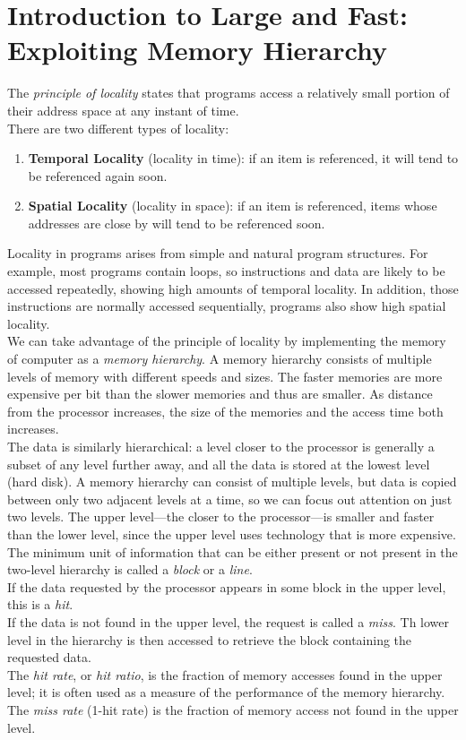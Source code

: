 \documentclass[12pt]{article}
\theoremstyle{definition}
\begin{document}
  \section{Introduction to Large and Fast: Exploiting Memory Hierarchy}
  The \emph{principle of locality} states that programs access a relatively small portion of their address space at any instant of time. \\
  There are two different types of locality:
  \begin{enumerate}
    \item \textbf{Temporal Locality} (locality in time): if an item is referenced, it will tend to be referenced again soon.
    \item \textbf{Spatial Locality} (locality in space): if an item is referenced, items whose addresses are close by will tend to be referenced soon.
  \end{enumerate}
  Locality in programs arises from simple and natural program structures.
  For example, most programs contain loops, so instructions and data are likely to be accessed repeatedly, showing high amounts of temporal locality.
  In addition, those instructions are normally accessed sequentially, programs also show high spatial locality. \\

  We can take advantage of the principle of locality by implementing the memory of computer as a \emph{memory hierarchy}.
  A memory hierarchy consists of multiple levels of memory with different speeds and sizes.
  The faster memories are more expensive per bit than the slower memories and thus are smaller.
  As distance from the processor increases, the size of the memories and the access time both increases. \\

  The data is similarly hierarchical: a level closer to the processor is generally a subset of any level further away, and all the data is stored at the lowest level (hard disk).
  A memory hierarchy can consist of multiple levels, but data is copied between only two adjacent levels at a time, so we can focus out attention on just two levels.
  The upper level---the closer to the processor---is smaller and faster than the lower level, since the upper level uses technology that is more expensive.
  The minimum unit of information that can be either present or not present in the two-level hierarchy is called a \emph{block} or a \emph{line}. \\

  If the data requested by the processor appears in some block in the upper level, this is a \emph{hit}. \\
  If the data is not found in the upper level, the request is called a \emph{miss}.
  Th lower level in the hierarchy is then accessed to retrieve the block containing the requested data. \\
  The \emph{hit rate}, or \emph{hit ratio}, is the fraction of memory accesses found in the upper level; it is often used as a measure of the performance of the memory hierarchy. \\
  The \emph{miss rate} (1-hit rate) is the fraction of memory access not found in the upper level. \\
\end{document}
